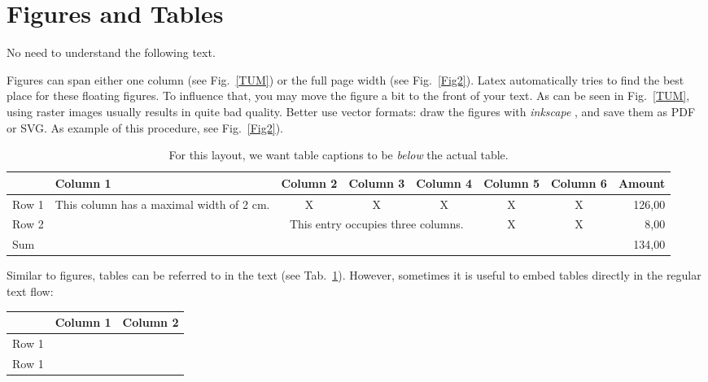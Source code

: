 \documentclass[twocolumn]{article}
\begin{document}
\section{Figures and Tables}

No need to understand the following text.

Figures can span either one column (see Fig.~\ref{TUM}) or the full
page width (see Fig.~\ref{Fig2}).
Latex automatically tries to find the best place for these floating
figures. To influence that, you may move the figure a bit to the front
of your text.
As can be seen in Fig.~\ref{TUM}, using raster images usually results in
quite bad quality. Better use vector formats: draw the figures with
{\em inkscape} \cite{inkscape}, and save them as PDF or SVG. As example of
this procedure, see Fig.~\ref{Fig2}).

\begin{table}
\label{Tab1}
\begin{center}
\begin{tabular}{|l|p{2cm}|c|c|c|c|c|r|}
\hline
	& Column 1 & Column 2 & Column 3 & Column 4& Column 5& Column 6& Amount\\
\hline
Row 1 & This column has a maximal width of 2 cm.& X & X& X& X& X& 126,00\\
\hline
Row 2 & & \multicolumn{3}{p{5cm}|}{This entry occupies three columns.}& X &X & 8,00\\
\hline
\multicolumn{7}{|l}{Sum} &134,00\\
\hline
\end{tabular}
\caption{For this layout, we want table captions to be {\em below} the actual table.}
\end{center}
\end{table}

Similar to figures, tables can be referred to in the text (see Tab.~\ref{Tab1}).
However, sometimes it is useful to embed tables directly in the regular
text flow:

\begin{center}
\begin{tabular}{|c|c|c|}
\hline
	& Column 1 & Column 2 \\
\hline
Row 1 & & \\
Row 1 & & \\
\hline
\end{tabular}
\end{center}
\end{document}
